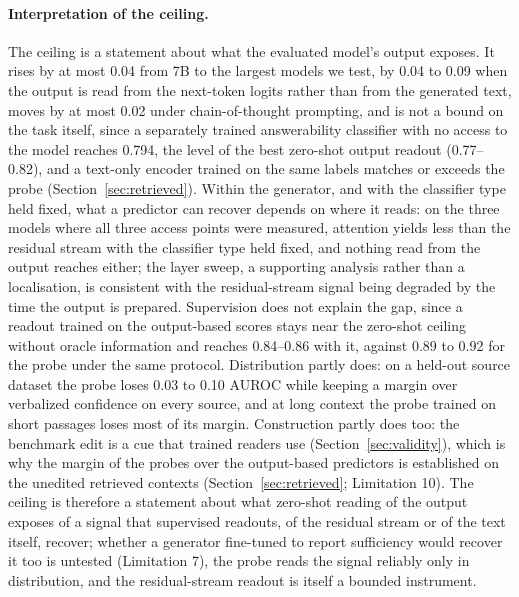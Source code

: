 \documentclass[acmsmall,screen,review]{acmart}
\begin{document}
\paragraph{Interpretation of the ceiling.}
The ceiling is a statement about what the evaluated model's output exposes. It rises by at most 0.04 from 7B to the largest models we test, by 0.04 to 0.09 when the output is read from the next-token logits rather than from the generated text, moves by at most 0.02 under chain-of-thought prompting, and is not a bound on the task itself, since a separately trained answerability classifier with no access to the model reaches 0.794, the level of the best zero-shot output readout (0.77--0.82), and a text-only encoder trained on the same labels matches or exceeds the probe (Section~\ref{sec:retrieved}). Within the generator, and with the classifier type held fixed, what a predictor can recover depends on where it reads: on the three models where all three access points were measured, attention yields less than the residual stream with the classifier type held fixed, and nothing read from the output reaches either; the layer sweep, a supporting analysis rather than a localisation, is consistent with the residual-stream signal being degraded by the time the output is prepared. Supervision does not explain the gap, since a readout trained on the output-based scores stays near the zero-shot ceiling without oracle information and reaches 0.84--0.86 with it, against 0.89 to 0.92 for the probe under the same protocol. Distribution partly does: on a held-out source dataset the probe loses 0.03 to 0.10 AUROC while keeping a margin over verbalized confidence on every source, and at long context the probe trained on short passages loses most of its margin. Construction partly does too: the benchmark edit is a cue that trained readers use (Section~\ref{sec:validity}), which is why the margin of the probes over the output-based predictors is established on the unedited retrieved contexts (Section~\ref{sec:retrieved}; Limitation 10). The ceiling is therefore a statement about what zero-shot reading of the output exposes of a signal that supervised readouts, of the residual stream or of the text itself, recover; whether a generator fine-tuned to report sufficiency would recover it too is untested (Limitation 7), the probe reads the signal reliably only in distribution, and the residual-stream readout is itself a bounded instrument.
\end{document}
